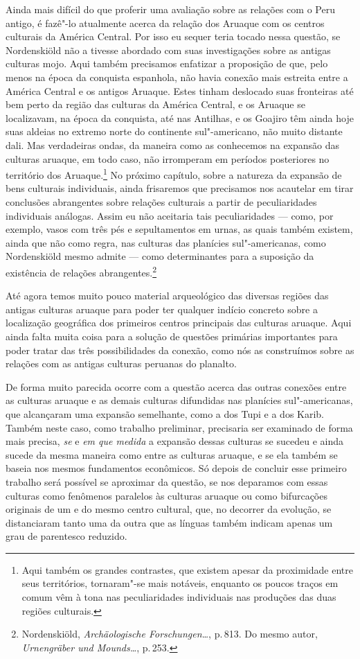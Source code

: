Ainda mais difícil do que proferir uma avaliação sobre as relações com o
Peru antigo, é fazê"-lo atualmente acerca da relação dos Aruaque com os
centros culturais da América Central. Por isso eu sequer teria tocado
nessa questão, se Nordenskiöld não a tivesse abordado com suas
investigações sobre as antigas culturas mojo. Aqui também precisamos
enfatizar a proposição de que, pelo menos na época da
conquista espanhola, não havia conexão mais estreita entre a América
Central e os antigos Aruaque. Estes tinham deslocado suas fronteiras até
bem perto da região das culturas da América Central, e os Aruaque se
localizavam, na época da conquista, até nas Antilhas, e os Goajiro têm
ainda hoje suas aldeias no extremo norte do continente sul"-americano,
não muito distante dali. Mas verdadeiras ondas, da maneira como as
conhecemos na expansão das culturas aruaque, em todo caso, não
irromperam em períodos posteriores no território dos Aruaque.\footnote{Aqui
também os grandes contrastes, que existem apesar da proximidade entre
seus territórios, tornaram"-se mais notáveis, enquanto os poucos traços
em comum vêm à tona nas peculiaridades individuais nas produções das
duas regiões culturais.} No próximo capítulo, sobre a natureza da
expansão de bens culturais individuais, ainda frisaremos que precisamos
nos acautelar em tirar conclusões abrangentes sobre relações culturais a
partir de peculiaridades individuais análogas. Assim eu não aceitaria
tais peculiaridades --- como, por exemplo, vasos com três pés e
sepultamentos em urnas, as quais também existem, ainda que não como
regra, nas culturas das planícies sul"-americanas, como Nordenskiöld
mesmo admite --- como determinantes para a suposição da existência de
relações abrangentes.\footnote{Nordenskiöld, \textit{Archäologische Forschungen\ldots}, p.\,813. Do mesmo autor,
  \textit{Urnengräber und Mounds\ldots}, p.\,253.}

Até agora temos muito pouco material arqueológico das diversas regiões
das antigas culturas aruaque para poder ter qualquer indício concreto
sobre a localização geográfica dos primeiros centros principais das
culturas aruaque. Aqui ainda falta muita coisa para a solução de
questões primárias importantes para poder tratar das três
possibilidades da conexão, como nós as construímos sobre as relações com
as antigas culturas peruanas do planalto.

De forma muito parecida ocorre com a questão acerca das outras conexões
entre as culturas aruaque e as demais culturas difundidas nas planícies
sul"-americanas, que alcançaram uma expansão semelhante, como a dos Tupi
e a dos Karib. Também neste caso, como trabalho preliminar, precisaria
ser examinado de forma mais precisa, \textit{se} e \textit{em que medida} a
expansão dessas culturas se sucedeu e ainda sucede da mesma maneira
como entre as culturas aruaque, e se ela também se baseia nos mesmos
fundamentos econômicos. Só depois de concluir esse primeiro trabalho 
será possível se aproximar da questão, se nos deparamos com essas
culturas como fenômenos paralelos às culturas aruaque ou como
bifurcações originais de um e do mesmo centro cultural, que, no decorrer
da evolução, se distanciaram tanto uma da outra que as línguas também
indicam apenas um grau de parentesco reduzido.

